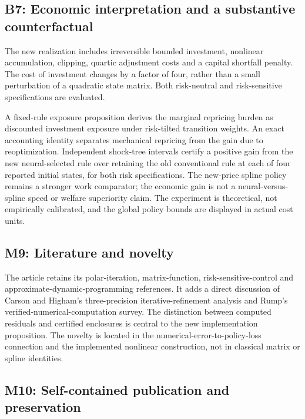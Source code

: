 \documentclass[
  11pt,
]{article}
\begin{document}
\hypertarget{b7-economic-interpretation-and-a-substantive-counterfactual}{%
\subsection{B7: Economic interpretation and a substantive
counterfactual}\label{b7-economic-interpretation-and-a-substantive-counterfactual}}

The new realization includes irreversible bounded investment, nonlinear
accumulation, clipping, quartic adjustment costs and a capital shortfall
penalty. The cost of investment changes by a factor of four, rather than
a small perturbation of a quadratic state matrix. Both risk-neutral and
risk-sensitive specifications are evaluated.

A fixed-rule exposure proposition derives the marginal repricing burden
as discounted investment exposure under risk-tilted transition weights.
An exact accounting identity separates mechanical repricing from the
gain due to reoptimization. Independent shock-tree intervals certify a
positive gain from the new neural-selected rule over retaining the old
conventional rule at each of four reported initial states, for both risk
specifications. The new-price spline policy remains a stronger work
comparator; the economic gain is not a neural-versus-spline speed or
welfare superiority claim. The experiment is theoretical, not
empirically calibrated, and the global policy bounds are displayed in
actual cost units.

\hypertarget{m9-literature-and-novelty}{%
\subsection{M9: Literature and
novelty}\label{m9-literature-and-novelty}}

The article retains its polar-iteration, matrix-function,
risk-sensitive-control and approximate-dynamic-programming references.
It adds a direct discussion of Carson and Higham's three-precision
iterative-refinement analysis and Rump's verified-numerical-computation
survey. The distinction between computed residuals and certified
enclosures is central to the new implementation proposition. The novelty
is located in the numerical-error-to-policy-loss connection and the
implemented nonlinear construction, not in classical matrix or spline
identities.

\hypertarget{m10-self-contained-publication-and-preservation}{%
\subsection{M10: Self-contained publication and
preservation}\label{m10-self-contained-publication-and-preservation}}
\end{document}
